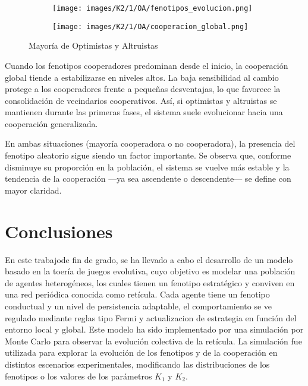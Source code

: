 \documentclass[a4paper,12pt]{report}
\begin{document}
\begin{figure}[h!]
    \centering
    \begin{subfigure}[t]{0.49\textwidth}
        \centering
        \texttt{[image: images/K2/1/OA/fenotipos\_evolucion.png]}
        \label{fig:enter-label}
    \end{subfigure}
    \hfill
    \begin{subfigure}[t]{0.49\textwidth}
        \centering
        \texttt{[image: images/K2/1/OA/cooperacion\_global.png]}
        \label{fig:enter-label}
    \end{subfigure}
    \caption{Mayoría de Optimistas y Altruistas}
\end{figure}

Cuando los fenotipos cooperadores predominan desde el inicio, la cooperación global tiende a estabilizarse en niveles altos. La baja sensibilidad al cambio protege a los cooperadores frente a pequeñas desventajas, lo que favorece la consolidación de vecindarios cooperativos. Así, si optimistas y altruistas se mantienen durante las primeras fases, el sistema suele evolucionar hacia una cooperación generalizada.

En ambas situaciones (mayoría cooperadora o no cooperadora), la presencia del fenotipo aleatorio sigue siendo un factor importante. Se observa que, conforme disminuye su proporción en la población, el sistema se vuelve más estable y la tendencia de la cooperación —ya sea ascendente o descendente— se define con mayor claridad.


\chapter{Conclusiones}

En este trabajode fin de grado, se ha llevado a cabo el desarrollo de un modelo basado en la toería de juegos evolutiva, cuyo objetivo es modelar una población de agentes heterogéneos, los cuales tienen un fenotipo estratégico y conviven en una red periódica conocida como retícula. Cada agente tiene un fenotipo conductual y un nivel de persistencia adaptable, el comportamiento se ve regulado mediante reglas tipo Fermi y actualizacion de estrategia en función del entorno local y global.
Este modelo ha sido implementado por una simulación por Monte Carlo para observar la evolución colectiva de la retícula. La simulación fue utilizada para explorar la evolución de los fenotipos y de la cooperación en distintos escenarios experimentales, modificando las distribuciones de los fenotipos o los valores de los parámetros \(K_1\) y \(K_2\).
\end{document}
